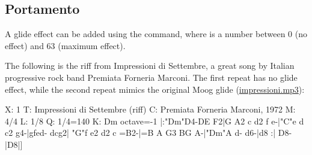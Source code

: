 \documentclass[a4paper,fullpage,12pt]{book}
\begin{document}









\subsection{Portamento}
\label{sec:portamento}

A glide effect can be added using the  command, where  is a
number between 0 (no effect) and 63 (maximum effect). %

The following is the riff from Impressioni di Settembre, a great song
by Italian progressive rock band Premiata Forneria Marconi. The first
repeat has no glide effect, while the second repeat mimics the
original Moog glide (\href{run:impressioni.mp3}{impressioni.mp3}):

\begin{abcsource}
X: 1
T: Impressioni di Settembre (riff)
C: Premiata Forneria Marconi, 1972
M: 4/4
L: 1/8
Q: 1/4=140
K: Dm octave=-1
%
%
|:"Dm"D4-DE F2|G A2 c d2 f e-|"C"e d c2 g4-|gfed- dcg2|
"G"f e2 d2 c =B2-|=B A G3 BG A-|"Dm"A d- d6-|d8
:|
D8-|D8|]
\end{abcsource}
\end{document}
